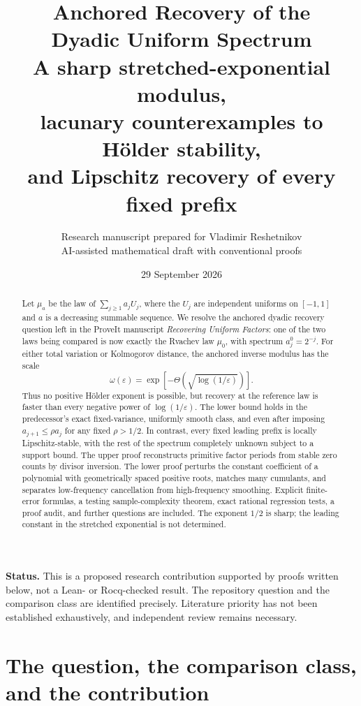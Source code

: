 \documentclass[11pt,a4paper]{article}
\title{\textbf{Anchored Recovery of the\\Dyadic Uniform Spectrum}\\[7pt]
\large A sharp stretched-exponential modulus,\\lacunary counterexamples to H\"older stability,\\and Lipschitz recovery of every fixed prefix}
\author{Research manuscript prepared for Vladimir Reshetnikov\\
\small AI-assisted mathematical draft with conventional proofs}
\date{29 September 2026}
\numberwithin{equation}{section}
\theoremstyle{definition}
\theoremstyle{remark}
\newcommand{\eps}{\varepsilon}
\begin{document}
\maketitle
\begin{abstract}
Let $\mu_a$ be the law of $\sum_{j\ge1}a_jU_j$, where the $U_j$ are
independent uniforms on $[-1,1]$ and $a$ is a decreasing summable sequence.
We resolve the anchored dyadic recovery question left in the ProveIt manuscript
\emph{Recovering Uniform Factors}: one of the two laws being compared is now
exactly the Rvachev law $\mu_0$, with spectrum $a_j^0=2^{-j}$.
For either total variation or Kolmogorov distance, the anchored inverse modulus
has the scale
\[
 \omega(\eps)=\exp\!\left[-\Theta\!\left(\sqrt{\log(1/\eps)}\right)\right].
\]
Thus no positive H\"older exponent is possible, but recovery at the reference
law is faster than every negative power of $\log(1/\eps)$.
The lower bound holds in the predecessor's exact fixed-variance,
uniformly smooth class, and even after imposing
$a_{j+1}\le\rho a_j$ for any fixed $\rho>1/2$.
In contrast, every fixed leading prefix is locally Lipschitz-stable, with the
rest of the spectrum completely unknown subject to a support bound.
The upper proof reconstructs primitive factor periods from stable zero counts
by divisor inversion. The lower proof perturbs the constant coefficient of a
polynomial with geometrically spaced positive roots, matches many cumulants,
and separates low-frequency cancellation from high-frequency smoothing.
Explicit finite-error formulas, a testing sample-complexity theorem,
exact rational regression tests, a proof audit, and further questions are included.
The exponent $1/2$ is sharp; the leading constant in the stretched exponential
is not determined.
\end{abstract}

\noindent\textbf{Status.} This is a proposed research contribution supported by
proofs written below, not a Lean- or Rocq-checked result. The repository
question and the comparison class are identified precisely. Literature priority
has not been established exhaustively, and independent review remains necessary.

\clearpage
\begingroup
\small
\setlength{\parskip}{0pt}
\tableofcontents
\endgroup
\clearpage

\section{The question, the comparison class, and the contribution}
\label{sec:question}
\end{document}
